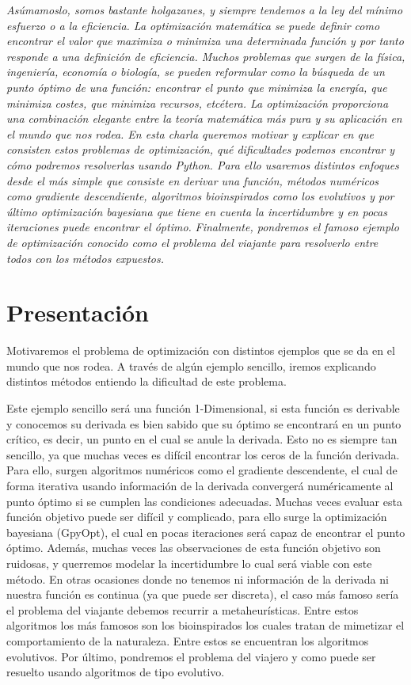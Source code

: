 \documentclass[runningheads]{llncs}
\begin{document}
	
	\textit{ Asúmamoslo, somos bastante holgazanes, y siempre tendemos a la ley del mínimo esfuerzo o a la eficiencia. La optimización matemática se puede definir como encontrar el valor que maximiza o minimiza una determinada función y por tanto responde a una definición de eficiencia. Muchos problemas que surgen de la física, ingeniería, economía o biología, se pueden reformular como la búsqueda de un punto óptimo de una función: encontrar el punto que minimiza la energía, que minimiza costes, que minimiza recursos, etcétera. La optimización proporciona una combinación elegante entre la teoría matemática más pura y su aplicación en el mundo que nos rodea. En esta charla queremos motivar y explicar en que consisten estos problemas de optimización, qué dificultades podemos encontrar y cómo podremos resolverlas usando Python. Para ello usaremos distintos enfoques desde el más simple que consiste en derivar una función, métodos numéricos como gradiente descendiente, algoritmos bioinspirados como los evolutivos y por último optimización bayesiana que tiene en cuenta la incertidumbre y en pocas iteraciones puede encontrar el óptimo.}	\textit{Finalmente, pondremos el famoso ejemplo de optimización conocido como el problema del viajante para resolverlo entre todos con los métodos expuestos.}

\section{Presentaci\'on}

Motivaremos el problema de optimización con distintos ejemplos que se da en el mundo que nos rodea. A través de algún ejemplo sencillo, iremos explicando distintos métodos entiendo la dificultad de este problema. 

Este ejemplo sencillo será una función 1-Dimensional, si esta función es derivable y conocemos su derivada es bien sabido que su óptimo se encontrará en un punto crítico, es decir, un punto en el cual se anule la derivada. Esto no es siempre tan sencillo, ya que muchas veces es difícil encontrar los ceros de la función derivada. Para ello, surgen algoritmos numéricos como el gradiente descendente, el cual de forma iterativa usando información de la derivada convergerá numéricamente al punto óptimo si se cumplen las condiciones adecuadas.
Muchas veces evaluar esta función objetivo puede ser difícil y complicado, para ello surge la optimización bayesiana (GpyOpt), el cual en pocas iteraciones será capaz de encontrar el punto óptimo. Además, muchas veces las observaciones de esta función objetivo son ruidosas, y querremos modelar la incertidumbre lo cual será viable con este método.
En otras ocasiones donde no tenemos ni información de la derivada ni nuestra función es continua (ya que puede ser discreta), el caso más famoso sería el problema del viajante debemos recurrir a metaheurísticas. Entre estos algoritmos los más famosos son los bioinspirados los cuales tratan de mimetizar el comportamiento de la naturaleza. Entre estos se encuentran los algoritmos evolutivos.
Por último, pondremos el problema del viajero y como puede ser resuelto usando algoritmos de tipo evolutivo.
\end{document}
